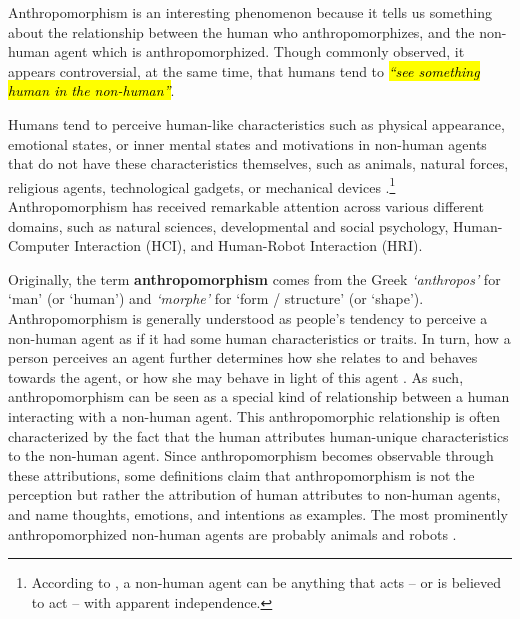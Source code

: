 \documentclass{frontiersSCNS} %
\begin{document}

Anthropomorphism is an interesting phenomenon because it tells us something about the relationship between the human who anthropomorphizes, and the non-human agent which is anthropomorphized. Though commonly observed, it appears controversial, at the same time, that humans tend to \hl{\textit{``see something human in the non-human''}}. 


Humans tend to perceive human-like characteristics such as physical appearance, emotional states, or inner mental states and motivations in non-human agents that do not have these characteristics themselves, such as animals, natural forces, religious agents, technological gadgets, or mechanical devices \citep{epley_when_2008}.\footnote{According to \cite{epley_when_2008}, a non-human agent can be anything that acts -- or is believed to act -- with apparent independence.}  Anthropomorphism has received remarkable attention across various different domains, such as natural sciences, developmental and social psychology, Human-Computer Interaction (HCI), and Human-Robot Interaction (HRI).

Originally, the term \textbf{anthropomorphism} comes from the Greek \textit{`anthropos'} for `man' (or `human') and \textit{`morphe'} for `form / structure' (or `shape'). Anthropomorphism is generally understood as people's tendency to perceive a non-human agent as if it had some human characteristics or traits. In turn, how a person perceives an agent further determines how she relates to and behaves towards the agent, or how she may behave in light of this agent \citep{epley_when_2008}.
As such, anthropomorphism can be seen as a special kind of relationship between a human interacting with a non-human agent. This anthropomorphic relationship is often characterized by the fact that the human attributes human-unique characteristics to the non-human agent. Since anthropomorphism becomes observable through these attributions, some definitions claim that anthropomorphism is not the perception but rather the attribution of human attributes to non-human agents, and name thoughts, emotions, and intentions as examples. The most prominently anthropomorphized non-human agents are probably animals and robots \citep{duffy_anthropomorphism_2003,schmitz_concepts_2011}.
\end{document}

